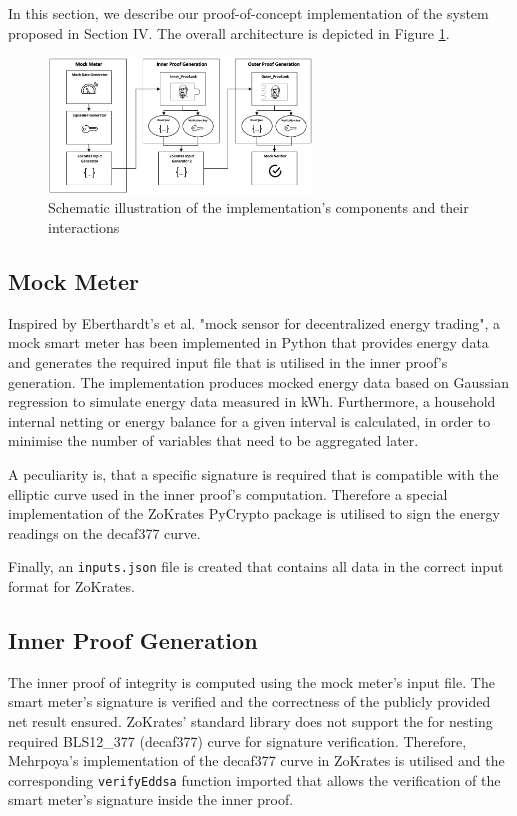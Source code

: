 In this section, we describe our proof-of-concept implementation of the system proposed in Section IV. The overall architecture is depicted in Figure \ref{fig:impel}. 

\begin{figure}[H]
  \centering
  \includegraphics[width=7cm]{img/impel.png}
  \caption{Schematic illustration of the implementation's components and their interactions}
  \label{fig:impel}
\end{figure}

\subsection{Mock Meter}
Inspired by Eberthardt's et al. \cite{DecentralizedEnergyTradingMockSensor} "mock sensor for decentralized energy trading", a mock smart meter has been implemented in Python that provides energy data and generates the required input file that is utilised in the inner proof's generation. The implementation produces mocked energy data based on Gaussian regression to simulate energy data measured in kWh. Furthermore, a household internal netting or energy balance for a given interval is calculated, in order to minimise the number of variables that need to be aggregated later. 

A peculiarity is, that a specific signature is required that is compatible with the elliptic curve used in the inner proof's computation. Therefore a special implementation of the ZoKrates PyCrypto package \cite{BachelorThesisGitHub} is utilised to sign the energy readings on the decaf377 curve. 

Finally, an \texttt{inputs.json} file is created that contains all data in the correct input format for ZoKrates. 

\subsection{Inner Proof Generation}
The inner proof of integrity is computed using the mock meter's input  file. The smart meter's signature is verified and the correctness of the publicly provided net result ensured. ZoKrates' standard library does not support the for nesting required BLS12\_377 (decaf377) curve for signature verification. 
Therefore, Mehrpoya's implementation of the decaf377 curve in ZoKrates \cite{BachelorThesisGitHub} is utilised and the corresponding \texttt{verifyEddsa} function imported that allows the verification of the smart meter's signature inside the inner proof.

